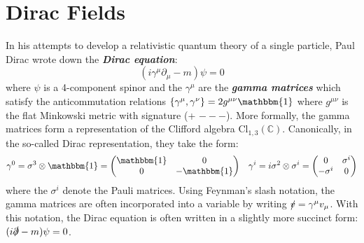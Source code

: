 \documentclass[onecolumn]{gwclass}
\renewcommand{\t}[1]{\text{#1}}
\begin{document}
\section{Dirac Fields}
In his attempts to develop a relativistic quantum theory of a single particle, Paul Dirac wrote down the \textbf{\emph{Dirac equation}}:
$$ (i\gamma^\mu\partial_\mu - m)\psi = 0 $$
where $\psi$ is a 4-component spinor and the $\gamma^\mu$ are the \textbf{\emph{gamma matrices}} which satisfy the anticommutation relations $\{\gamma^\mu,\gamma^\nu\}=2g^{\mu\nu}\mathbbm{1}$ where $g^{\mu\nu}$ is the flat Minkowski metric with signature (+ $- - -$). More formally, the gamma matrices form a representation of the Clifford algebra $\t{Cl}_{1,3}(\mathbb{C})$. Canonically, in the so-called Dirac representation, they take the form:
\begin{align*}
	\gamma^0 = \sigma^3\otimes\mathbbm{1} =\begin{pmatrix}
		\mathbbm{1} & 0 \\
		0 & -\mathbbm{1}
	\end{pmatrix} && 
	\gamma^i = i\sigma^2\otimes \sigma^i=\begin{pmatrix}
		0 & \sigma^i \\
		-\sigma^i & 0
	\end{pmatrix}
\end{align*}
where the $\sigma^i$ denote the Pauli matrices. Using Feynman's slash notation, the gamma matrices are often incorporated into a variable by writing $\slashed{v}=\gamma^\mu v_\mu$. With this notation, the Dirac equation is often written in a slightly more succinct form: $(i\slashed{\partial} - m)\psi=0$. 
\end{document}
